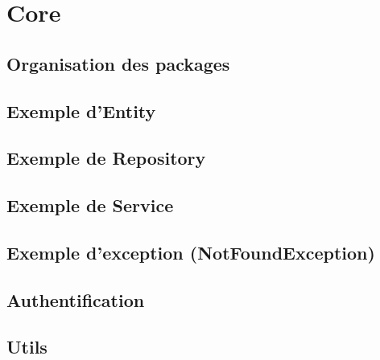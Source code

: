 \chapter{Core}
	\section{Organisation des packages}
	\section{Exemple d'Entity}
	\section{Exemple de Repository}
	\section{Exemple de Service}
	\section{Exemple d'exception (NotFoundException)}
	\section{Authentification}
	\section{Utils}
